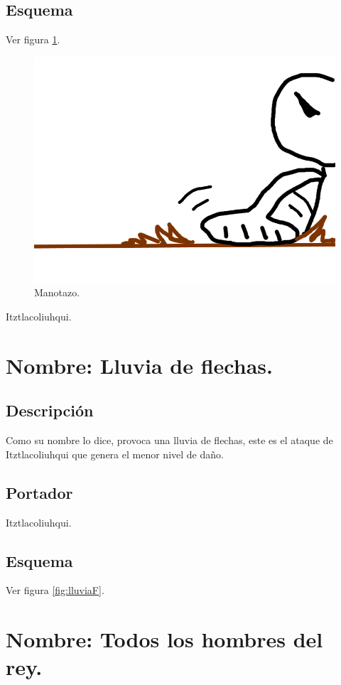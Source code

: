 \subsection{Esquema}
			Ver figura \ref{fig:manotazo}.
			\begin{figure}
				\centering
				\includegraphics[height=0.2 \textheight]{Imagenes/manotazo}
				\caption{Manotazo.}
				\label{fig:manotazo}
			\end{figure}
Itztlacoliuhqui.

\section{Nombre: Lluvia de flechas.} \label{hab.LluviaFle}
\subsection{Descripción}
Como su nombre lo dice, provoca una lluvia de flechas, este es el ataque de Itztlacoliuhqui que genera el menor nivel de daño. 
\subsection{Portador}
Itztlacoliuhqui.
\subsection{Esquema}
			Ver figura \ref{fig:lluviaF}.

\section{Nombre: Todos los hombres del rey.}\label{hab.TodoRey}
